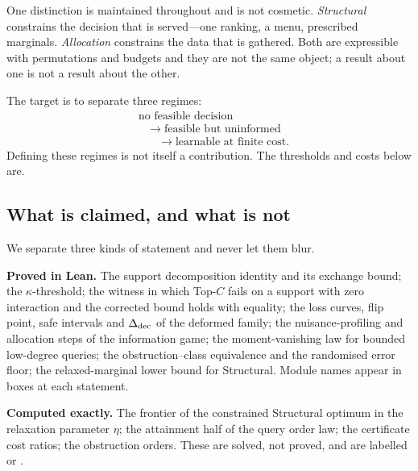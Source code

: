 One distinction is maintained throughout and is not cosmetic. \emph{Structural} constrains
the decision that is served---one ranking, a menu, prescribed marginals. \emph{Allocation}
constrains the data that is gathered. Both are expressible with permutations and budgets
and they are not the same object; a result about one is not a result about the other.

The target is to separate three regimes:
\begin{equation}
\begin{aligned}
&\text{no feasible decision}\\
&\quad\to\;\text{feasible but uninformed}\\
&\qquad\to\;\text{learnable at finite cost.}
\end{aligned}
\label{eq:regimes}
\end{equation}
Defining these regimes is not itself a contribution. The thresholds and costs below are.

\subsection{What is claimed, and what is not}

We separate three kinds of statement and never let them blur.

\textbf{Proved in Lean.} The support decomposition identity and its exchange bound; the
$\kappa$-threshold; the witness in which Top-$C$ fails on a support with zero interaction
and the corrected bound holds with equality; the loss curves, flip point, safe intervals
and $\Delta_{\rm dec}$ of the deformed family; the nuisance-profiling and allocation steps
of the information game; the moment-vanishing law for bounded low-degree queries; the
obstruction--class equivalence and the randomised error floor; the relaxed-marginal
lower bound for Structural. Module names appear in \leanbox{} boxes at each statement.

\textbf{Computed exactly.} The frontier of the constrained Structural optimum in the
relaxation parameter $\eta$; the attainment half of the query order law; the certificate
cost ratios; the obstruction orders. These are solved, not proved, and are labelled
\CERT{} or \NUM{}.

